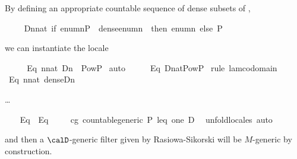 \noindent By defining an appropriate countable sequence of dense subsets of ,
\begin{isabelle}

\ \ \isamarkupfalse%
\isanewline
   \ \ {\isacharquery}D{\isacharequal}{\isachardoublequoteopen}{\isasymlambda}n{\isasymin}nat{\isachardot}\ {\isacharparenleft}if\ {\isacharparenleft}enum{\isacharbackquote}n{\isasymsubseteq}P\ {\isasymand}\ dense{\isacharparenleft}enum{\isacharbackquote}n{\isacharparenright}{\isacharparenright}\ \ then\ enum{\isacharbackquote}n\ else\ P{\isacharparenright}{\isachardoublequoteclose}
\end{isabelle}
\noindent we can instantiate the locale 

\begin{isabelle}

\ \ \isamarkupfalse%
\ \isanewline
  \ Eq{}{\isacharcolon}\ {\isachardoublequoteopen}{\isasymforall}n{\isasymin}nat{\isachardot}\ {\isacharquery}D{\isacharbackquote}n\ {\isasymin}\ Pow{\isacharparenleft}P{\isacharparenright}{\isachardoublequoteclose}\isanewline
 \isamarkupfalse%
\ auto\isanewline
\ \ \isamarkupfalse%
\ \isamarkupfalse%
\isanewline
  \ Eq{}{\isacharcolon}\ {\isachardoublequoteopen}{\isacharquery}D{\isacharcolon}nat{\isasymrightarrow}Pow{\isacharparenleft}P{\isacharparenright}{\isachardoublequoteclose}\isanewline
 \isamarkupfalse%
\ {\isacharparenleft}rule\ lam{\isacharunderscore}codomain{\isacharparenright}\isanewline
\ \ \isamarkupfalse%
\isanewline
  \ Eq{}{\isacharcolon}\ {\isachardoublequoteopen}{\isasymforall}n{\isasymin}nat{\isachardot}\ dense{\isacharparenleft}{\isacharquery}D{\isacharbackquote}n{\isacharparenright}{\isachardoublequoteclose}
\end{isabelle}
\dots
\begin{isabelle}

\ \ \isamarkupfalse%
\ Eq{}\ \ Eq{}\ \isamarkupfalse%
\ \isanewline
  \ \ cg{\isacharcolon}\ countable{\isacharunderscore}generic\ P\ leq\ one\ {\isacharquery}D\ \isanewline
 \isamarkupfalse%
\ {\isacharparenleft}unfold{\isacharunderscore}locales{\isacharcomma}\ auto{\isacharparenright}
\end{isabelle}
%
and then a  $\calD$-generic filter given by Rasiowa-Sikorski will be $M$-generic by construction. 

